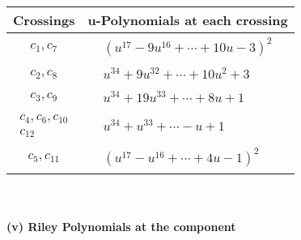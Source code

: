 \documentclass[1p]{elsarticle_modified}
\theoremstyle{definition}
\begin{document}
\begin{tabular}{m{50pt}|m{274pt}}
Crossings & \hspace{64pt}u-Polynomials at each crossing \\
\hline $$\begin{aligned}c_{1},c_{7}\end{aligned}$$&$\begin{aligned}
&(u^{17}-9 u^{16}+\cdots+10 u-3)^{2}
\end{aligned}$\\
\hline $$\begin{aligned}c_{2},c_{8}\end{aligned}$$&$\begin{aligned}
&u^{34}+9 u^{32}+\cdots+10 u^2+3
\end{aligned}$\\
\hline $$\begin{aligned}c_{3},c_{9}\end{aligned}$$&$\begin{aligned}
&u^{34}+19 u^{33}+\cdots+8 u+1
\end{aligned}$\\
\hline $$\begin{aligned}c_{4},c_{6},c_{10}\\c_{12}\end{aligned}$$&$\begin{aligned}
&u^{34}+u^{33}+\cdots- u+1
\end{aligned}$\\
\hline $$\begin{aligned}c_{5},c_{11}\end{aligned}$$&$\begin{aligned}
&(u^{17}- u^{16}+\cdots+4 u-1)^{2}
\end{aligned}$\\
\hline
\end{tabular}\\~\\
\newpage\renewcommand{\arraystretch}{1}
\flushleft \textbf{(v) Riley Polynomials at the component}\newline \\
\end{document}
